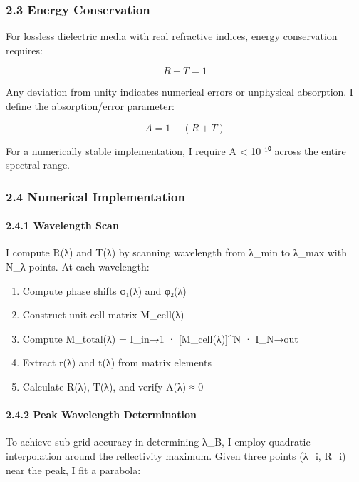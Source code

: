\documentclass[
]{article}
\providecommand{\tightlist}{%
  \setlength{\itemsep}{0pt}\setlength{\parskip}{0pt}}
\begin{document}
\subsubsection{2.3 Energy Conservation}\label{energy-conservation}

For lossless dielectric media with real refractive indices, energy
conservation requires:

\[R + T = 1\]

Any deviation from unity indicates numerical errors or unphysical
absorption. I define the absorption/error parameter:

\[A = 1 - (R + T)\]

For a numerically stable implementation, I require \textbar A\textbar{}
\textless{} 10⁻¹⁰ across the entire spectral range.

\subsubsection{2.4 Numerical
Implementation}\label{numerical-implementation}

\paragraph{2.4.1 Wavelength Scan}\label{wavelength-scan}

I compute R(λ) and T(λ) by scanning wavelength from λ\_min to λ\_max
with N\_λ points. At each wavelength:

\begin{enumerate}
\def\labelenumi{\arabic{enumi}.}
\tightlist
\item
  Compute phase shifts φ₁(λ) and φ₂(λ)
\item
  Construct unit cell matrix M\_cell(λ)
\item
  Compute M\_total(λ) = I\_in→1 · {[}M\_cell(λ){]}\^{}N · I\_N→out
\item
  Extract r(λ) and t(λ) from matrix elements
\item
  Calculate R(λ), T(λ), and verify A(λ) ≈ 0
\end{enumerate}

\paragraph{2.4.2 Peak Wavelength
Determination}\label{peak-wavelength-determination}

To achieve sub-grid accuracy in determining λ\_B, I employ quadratic
interpolation around the reflectivity maximum. Given three points (λ\_i,
R\_i) near the peak, I fit a parabola:
\end{document}
